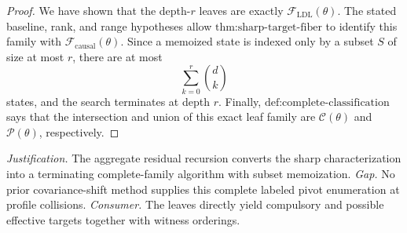 \documentclass{article}
\begin{document}
\begin{proof}
We have shown that the depth-\(r\) leaves are exactly \(\mathcal F_{\mathrm{LDL}}(\theta)\).  The stated baseline, rank, and range hypotheses allow \(\text{thm:sharp-target-fiber}\) to identify this family with \(\mathcal F_{\mathrm{causal}}(\theta)\).  Since a memoized state is indexed only by a subset \(S\) of size at most \(r\), there are at most
\[
 \sum_{k=0}^r\binom{d}{k}
\]
states, and the search terminates at depth \(r\).  Finally, \(\text{def:complete-classification}\) says that the intersection and union of this exact leaf family are \(\mathcal C(\theta)\) and \(\mathcal P(\theta)\), respectively.
\end{proof}
\par\smallskip\noindent \textit{Justification.} The aggregate residual recursion converts the sharp characterization into a terminating complete-family algorithm with subset memoization. \textit{Gap.} No prior covariance-shift method supplies this complete labeled pivot enumeration at profile collisions. \textit{Consumer.} The leaves directly yield compulsory and possible effective targets together with witness orderings.
\end{document}
